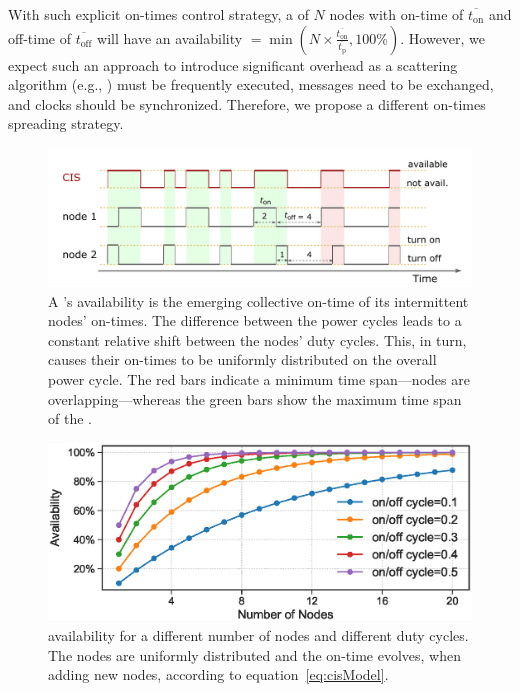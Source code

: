 With such explicit on-times control strategy, a \cis of $N$ nodes with on-time of $\overline{t_\text{on}}$ and off-time of $\overline{t_\text{off}}$ will have an availability 
$= \min \left(N\times \frac{\overline{t_\text{on}}}{\overline{t_\text{p}}}, 100\%\right)$. However, we expect such an approach to introduce significant overhead as a scattering algorithm (e.g., \cite{giusti2007decentralized}) must be frequently executed, messages need to be exchanged, and clocks should be synchronized. Therefore, we propose a different on-times spreading strategy.  
%
\begin{figure}[t]
		\centering
		\includegraphics[width=\columnwidth]{figures/cisOntime}
		\caption{A \fullcis's availability is the emerging collective
		on-time of its intermittent nodes' on-times. The difference
		between the power cycles leads to a constant relative shift
		between the nodes' duty cycles. This, in turn, causes their on-times to be uniformly distributed on the overall power cycle. The red bars indicate a minimum \cis time span---\cis nodes are overlapping---whereas the green bars show the maximum time span of the \cis.}
		\label{fig:cisOntime}
\end{figure} 
%
\begin{figure}
		\centering
		\includegraphics[width=\columnwidth]{figures/cisModel_2}
		\caption{\fullcis availability for a different number of nodes and different duty cycles. The nodes are uniformly distributed and the \cis on-time evolves, when adding new nodes, according to equation~\ref{eq:cisModel}.}
		\label{fig:cisModel}
\end{figure} 
%
